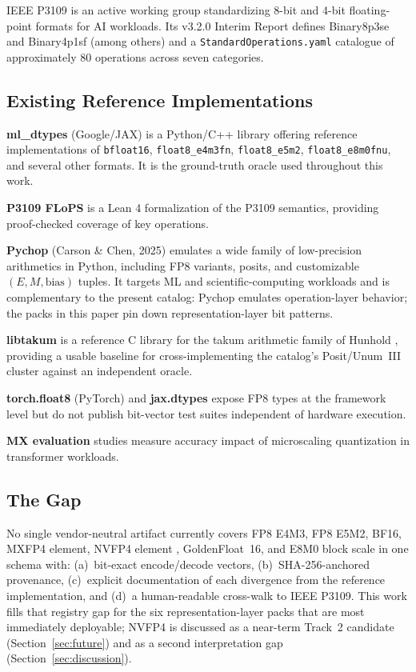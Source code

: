\documentclass[11pt,letterpaper]{article}
\begin{document}
IEEE P3109 \cite{p3109_interim} is an active working group standardizing
8-bit and 4-bit floating-point formats for AI workloads.  Its v3.2.0 Interim
Report defines Binary8p3se and Binary4p1sf (among others) and a
\texttt{StandardOperations.yaml} catalogue of approximately 80 operations
across seven categories.

\subsection{Existing Reference Implementations}

\textbf{ml\_dtypes} \cite{mldtypes} (Google/JAX) is a Python/C++ library
offering reference implementations of \texttt{bfloat16},
\texttt{float8\_e4m3fn}, \texttt{float8\_e5m2}, \texttt{float8\_e8m0fnu},
and several other formats.  It is the ground-truth oracle used throughout this
work.

\textbf{P3109 FLoPS} \cite{flops_lean} is a Lean 4 formalization of the P3109
semantics, providing proof-checked coverage of key operations.

\textbf{Pychop} \cite{pychop} (Carson \& Chen, 2025) emulates a wide family
of low-precision arithmetics in Python, including FP8 variants, posits, and
customizable $(E,M,\text{bias})$ tuples.  It targets ML and scientific-computing
workloads and is complementary to the present catalog: Pychop emulates
operation-layer behavior; the packs in this paper pin down representation-layer
bit patterns.

\textbf{libtakum} \cite{libtakum} is a reference C library for the takum
arithmetic family of Hunhold \cite{takum, hunhold_quinlan}, providing a usable
baseline for cross-implementing the catalog's Posit/Unum~III cluster against
an independent oracle.

\textbf{torch.float8} (PyTorch) and \textbf{jax.dtypes} expose FP8 types at
the framework level but do not publish bit-vector test suites independent of
hardware execution.

\textbf{MX evaluation} studies \cite{mx_eval} measure accuracy impact of
microscaling quantization in transformer workloads.

\subsection{The Gap}

No single vendor-neutral artifact currently covers FP8 E4M3, FP8 E5M2, BF16,
MXFP4 element, NVFP4 element \cite{nvfp4}, GoldenFloat~16, and E8M0 block scale
in one schema with: (a)~bit-exact encode/decode vectors, (b)~SHA-256-anchored
provenance, (c)~explicit documentation of each divergence from the reference
implementation, and (d)~a human-readable cross-walk to IEEE P3109.  This work
fills that registry gap for the six representation-layer packs that are most
immediately deployable; NVFP4 is discussed as a near-term Track~2 candidate
(Section~\ref{sec:future}) and as a second interpretation gap
(Section~\ref{sec:discussion}).
\end{document}
